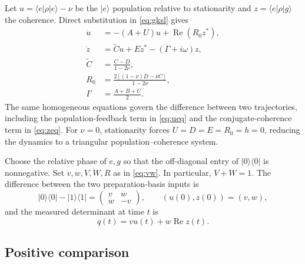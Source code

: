 \documentclass[aps,pra,reprint,amsmath,amssymb,nofootinbib,floatfix,longbibliography]{revtex4-2}
\theoremstyle{aps}
\newcommand{\ket}[1]{|#1\rangle}
\newcommand{\bra}[1]{\langle#1|}
\newcommand{\proj}[1]{|#1\rangle\langle#1|}
\begin{document}
Let $u=\bra e\rho\ket e-\nu$ be the $\ket e$ population relative to stationarity and $z=\bra e\rho\ket g$ the coherence. Direct substitution in \eqref{eq:gksl} gives
\begin{align}
 \dot u&=-(A+U)u+\operatorname{Re}(R_0z^*),\label{eq:ueq}\\
 \dot z&=\widetilde C u+Ez^*-(\Gamma+i\omega)z,\label{eq:zeq}\\
 \widetilde C&=\frac{C-D}{1-2\nu},\nonumber\\
 R_0&=\frac{2[(1-\nu)D-\nu C]}{1-2\nu},\nonumber\\
 \Gamma&=\frac{A+B+U}{2}.\nonumber
\end{align}
The same homogeneous equations govern the difference between two trajectories, including the population-feedback term in \eqref{eq:ueq} and the conjugate-coherence term in \eqref{eq:zeq}. For $\nu=0$, stationarity forces $U=D=E=R_0=h=0$, reducing the dynamics to a triangular population--coherence system.

Choose the relative phase of $e,g$ so that the off-diagonal entry of $\proj0$ is nonnegative. Set
$v,w,V,W,R$ as in \eqref{eq:vw}.
In particular, $V+W=1$. The difference between the two preparation-basis inputs is
\begin{equation}\label{eq:initial}
 \proj0-\proj1=\begin{pmatrix}v&w\\w&-v\end{pmatrix},
 \qquad (u(0),z(0))=(v,w),
\end{equation}
and the measured determinant at time $t$ is
\begin{equation}\label{eq:readq}
 q(t)=v u(t)+w\operatorname{Re}z(t).
\end{equation}

\subsection{Positive comparison}
\end{document}
